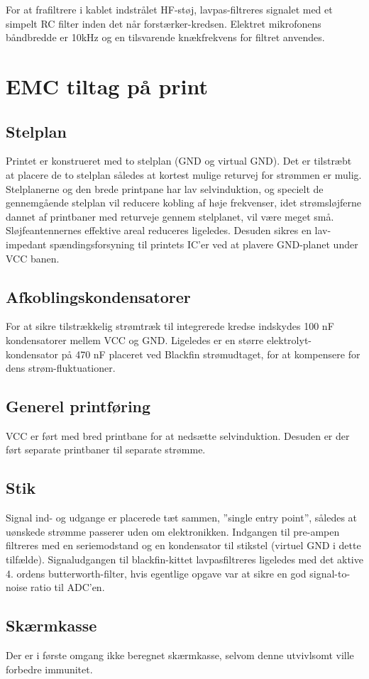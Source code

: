 For at frafiltrere i kablet indstrålet HF-støj, lavpas-filtreres signalet med et simpelt RC filter inden det når forstærker-kredsen. Elektret mikrofonens båndbredde er 10kHz og en tilsvarende knækfrekvens for filtret anvendes.

\section{EMC tiltag på print}

\subsection*{Stelplan}

Printet er konstrueret med to stelplan (GND og virtual GND). Det er tilstræbt at placere de to stelplan således at kortest mulige returvej for strømmen er mulig. Stelplanerne og den brede printpane har lav selvinduktion, og specielt de gennemgående stelplan vil reducere kobling af høje frekvenser, idet strømsløjferne dannet af printbaner med returveje gennem stelplanet, vil være meget små. Sløjfeantennernes effektive areal reduceres ligeledes. Desuden sikres en lav-impedant spændingsforsyning til printets IC’er ved at plavere GND-planet under VCC banen.

\subsection*{Afkoblingskondensatorer}

For at sikre tilstrækkelig strømtræk til integrerede kredse indskydes 100 nF kondensatorer mellem VCC og GND. Ligeledes er en større elektrolyt-kondensator på 470 nF placeret ved Blackfin strømudtaget, for at kompensere for dens strøm-fluktuationer.


\subsection*{Generel printføring}

VCC er ført med bred printbane for at nedsætte selvinduktion. Desuden er der ført separate printbaner til separate strømme.

\subsection*{Stik}

Signal ind- og udgange er placerede tæt sammen, ''single entry point'', således at uønskede strømme passerer uden om elektronikken. Indgangen til pre-ampen filtreres med en seriemodstand og en kondensator til stikstel (virtuel GND i dette tilfælde). Signaludgangen til blackfin-kittet lavpasfiltreres ligeledes med det aktive 4. ordens butterworth-filter, hvis egentlige opgave var at sikre en god signal-to-noise ratio til ADC’en.

\subsection*{Skærmkasse}

Der er i første omgang ikke beregnet skærmkasse, selvom denne utvivlsomt ville forbedre immunitet.
